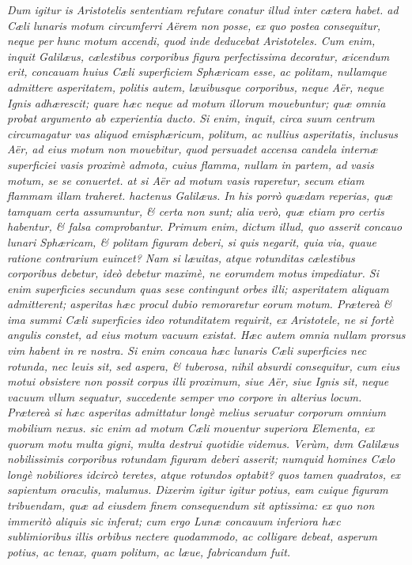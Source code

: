 \documentclass[11pt,twoside,openany]{book}
\begin{document}
\textit{Dum igitur is Aristotelis sententiam refutare conatur illud inter cætera habet. ad Cæli lunaris motum circumferri Aërem non posse, ex quo postea consequitur, neque per hunc motum accendi, quod inde deducebat Aristoteles. Cum enim, inquit Galilæus, cælestibus corporibus figura perfectissima decoratur, æicendum erit, concauam huius Cæli superficiem Sphæricam esse, ac politam, nullamque admittere asperitatem, politis autem, læuibusque corporibus, neque Aër, neque Ignis adhærescit; quare hæc neque ad motum illorum mouebuntur; quæ omnia probat argumento ab experientia ducto. Si enim, inquit, circa suum centrum circumagatur vas aliquod emisphæricum, politum, ac nullius asperitatis, inclusus Aër, ad eius motum non mouebitur, quod persuadet accensa candela internæ superficiei vasis proximè admota, cuius flamma, nullam in partem, ad vasis motum, se se conuertet. at si Aër ad motum vasis raperetur, secum etiam flammam illam traheret. hactenus Galilæus. In his porrò quædam reperias, quæ tamquam certa assumuntur, \& certa non sunt; alia verò, quæ etiam pro certis habentur, \& falsa comprobantur. Primum enim, dictum illud, quo asserit concauo lunari Sphæricam, \& politam figuram deberi, si quis negarit, quia via, quaue ratione contrarium euincet? Nam si læuitas, atque rotunditas cælestibus corporibus debetur, ideò debetur maximè, ne eorumdem motus impediatur. Si enim superficies secundum quas sese contingunt orbes illi; asperitatem aliquam admitterent; asperitas hæc procul dubio remoraretur eorum motum. Prætereà \& ima summi Cæli superficies ideo rotunditatem requirit, ex Aristotele, ne si fortè angulis constet, ad eius motum vacuum existat. Hæc autem omnia nullam prorsus vim habent in re nostra. Si enim concaua hæc lunaris Cæli superficies nec rotunda, nec leuis sit, sed aspera, \& tuberosa, nihil absurdi consequitur, cum eius motui obsistere non possit corpus illi proximum, siue Aër, siue Ignis sit, neque vacuum vllum sequatur, succedente semper vno corpore in alterius locum. Prætereà si hæc asperitas admittatur longè melius seruatur corporum omnium mobilium nexus. sic enim ad motum Cæli mouentur superiora Elementa, ex quorum motu multa gigni, multa destrui quotidie videmus. Verùm, dvm Galilæus nobilissimis corporibus rotundam figuram deberi asserit; numquid homines Cælo longè nobiliores idcircò teretes, atque rotundos optabit? quos tamen quadratos, ex sapientum oraculis, malumus. Dixerim igitur igitur potius, eam cuique figuram tribuendam, quæ ad eiusdem finem consequendum sit aptissima: ex quo non immeritò aliquis sic inferat; cum ergo Lunæ concauum inferiora hæc sublimioribus illis orbibus nectere quodammodo, ac colligare debeat, asperum potius, ac tenax, quam politum, ac læue, fabricandum fuit.}
\end{document}
